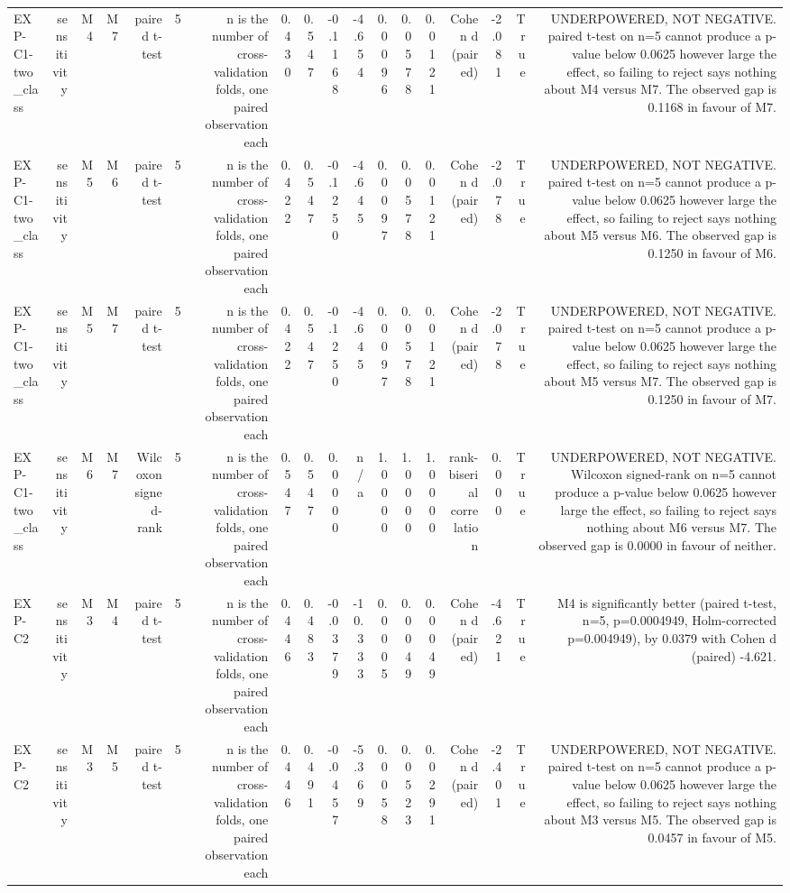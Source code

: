 \begin{table}[htbp]
\begin{tabular}{lrrrrrrrrrrrrrrrrr}
    EXP-C1-two\_class & sensitivity & M4 & M7 & paired t-test & 5 & n is the number of cross-validation folds, one paired observation each & 0.430 & 0.547 & -0.1168 & -4.654 & 0.0096 & 0.0578 & 0.0121 & Cohen d (paired) & -2.081 & True & UNDERPOWERED, NOT NEGATIVE. paired t-test on n=5 cannot produce a p-value below 0.0625 however large the effect, so failing to reject says nothing about M4 versus M7. The observed gap is 0.1168 in favour of M7. \\
    EXP-C1-two\_class & sensitivity & M5 & M6 & paired t-test & 5 & n is the number of cross-validation folds, one paired observation each & 0.422 & 0.547 & -0.1250 & -4.645 & 0.0097 & 0.0578 & 0.0121 & Cohen d (paired) & -2.078 & True & UNDERPOWERED, NOT NEGATIVE. paired t-test on n=5 cannot produce a p-value below 0.0625 however large the effect, so failing to reject says nothing about M5 versus M6. The observed gap is 0.1250 in favour of M6. \\
    EXP-C1-two\_class & sensitivity & M5 & M7 & paired t-test & 5 & n is the number of cross-validation folds, one paired observation each & 0.422 & 0.547 & -0.1250 & -4.645 & 0.0097 & 0.0578 & 0.0121 & Cohen d (paired) & -2.078 & True & UNDERPOWERED, NOT NEGATIVE. paired t-test on n=5 cannot produce a p-value below 0.0625 however large the effect, so failing to reject says nothing about M5 versus M7. The observed gap is 0.1250 in favour of M7. \\
    EXP-C1-two\_class & sensitivity & M6 & M7 & Wilcoxon signed-rank & 5 & n is the number of cross-validation folds, one paired observation each & 0.547 & 0.547 & 0.0000 & n/a & 1.0000 & 1.0000 & 1.0000 & rank-biserial correlation & 0.000 & True & UNDERPOWERED, NOT NEGATIVE. Wilcoxon signed-rank on n=5 cannot produce a p-value below 0.0625 however large the effect, so failing to reject says nothing about M6 versus M7. The observed gap is 0.0000 in favour of neither. \\
    EXP-C2 & sensitivity & M3 & M4 & paired t-test & 5 & n is the number of cross-validation folds, one paired observation each & 0.446 & 0.483 & -0.0379 & -10.333 & 0.0005 & 0.0049 & 0.0049 & Cohen d (paired) & -4.621 & True & M4 is significantly better (paired t-test, n=5, p=0.0004949, Holm-corrected p=0.004949), by 0.0379 with Cohen d (paired) -4.621. \\
    EXP-C2 & sensitivity & M3 & M5 & paired t-test & 5 & n is the number of cross-validation folds, one paired observation each & 0.446 & 0.491 & -0.0457 & -5.369 & 0.0058 & 0.0523 & 0.0291 & Cohen d (paired) & -2.401 & True & UNDERPOWERED, NOT NEGATIVE. paired t-test on n=5 cannot produce a p-value below 0.0625 however large the effect, so failing to reject says nothing about M3 versus M5. The observed gap is 0.0457 in favour of M5. \\

\end{tabular}
\end{table}
